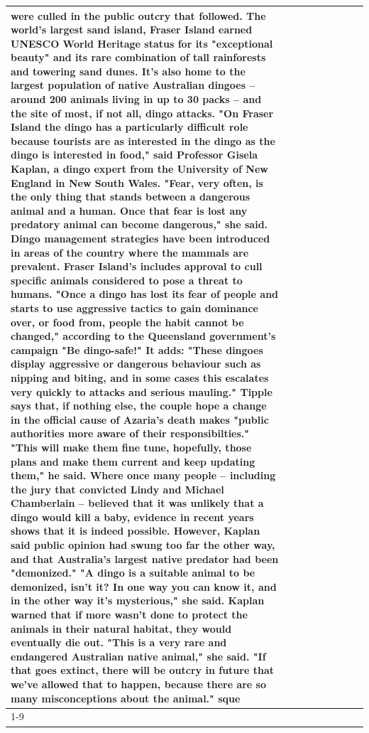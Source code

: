 \begin{table}[H]
\begin{tabular}{lllrlllll}
were culled in the public outcry that followed. The world's largest sand island, Fraser Island earned UNESCO World Heritage status for its "exceptional beauty" and its rare combination of tall rainforests and towering sand dunes. It's also home to the largest population of native Australian dingoes -- around 200 animals living in up to 30 packs -- and the site of most, if not all, dingo attacks. "On Fraser Island the dingo has a particularly difficult role because tourists are as interested in the dingo as the dingo is interested in food," said Professor Gisela Kaplan, a dingo expert from the University of New England in New South Wales. "Fear, very often, is the only thing that stands between a dangerous animal and a human. Once that fear is lost any predatory animal can become dangerous," she said. Dingo management strategies have been introduced in areas of the country where the mammals are prevalent. Fraser Island's includes approval to cull specific animals considered to pose a threat to humans. "Once a dingo has lost its fear of people and starts to use aggressive tactics to gain dominance over, or food from, people the habit cannot be changed," according to the Queensland government's campaign "Be dingo-safe!" It adds: "These dingoes display aggressive or dangerous behaviour such as nipping and biting, and in some cases this escalates very quickly to attacks and serious mauling." Tipple says that, if nothing else, the couple hope a change in the official cause of Azaria's death makes "public authorities more aware of their responsibilties." "This will make them fine tune, hopefully, those plans and make them current and keep updating them," he said. Where once many people -- including the jury that convicted Lindy and Michael Chamberlain -- believed that it was unlikely that a dingo would kill a baby, evidence in recent years shows that it is indeed possible. However, Kaplan said public opinion had swung too far the other way, and that Australia's largest native predator had been "demonized." "A dingo is a suitable animal to be demonized, isn't it? In one way you can know it, and in the other way it's mysterious," she said. Kaplan warned that if more wasn't done to protect the animals in their natural habitat, they would eventually die out. "This is a very rare and endangered Australian native animal," she said. "If that goes extinct, there will be outcry in future that we've allowed that to happen, because there are so many misconceptions about the animal." sque \\
\cline{1-9}

\end{tabular}
\end{table}
